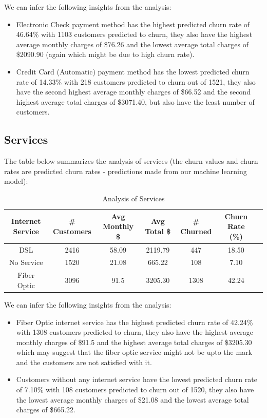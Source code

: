 \documentclass{article}
\theoremstyle{mytheoremstyle}
\theoremstyle{mytheoremstyle}
\theoremstyle{myproblemstyle}
\begin{document}
We can infer the following insights from the analysis:

\begin{itemize}
    \item Electronic Check payment method has the highest predicted churn rate of 46.64\% with 1103 customers predicted to churn, they also have the highest average monthly charges of \$76.26 and the lowest average total charges of \$2090.90 (again which might be due to high churn rate).
    \item Credit Card (Automatic) payment method has the lowest predicted churn rate of 14.33\% with 218 customers predicted to churn out of 1521, they also have the second highest average monthly charges of \$66.52 and the second highest average total charges of \$3071.40, but also have the least number of customers.
\end{itemize}


\subsection{Services}
The table below summarizes the analysis of services (the churn values and churn rates are predicted churn rates - predictions made from our machine learning model):

\begin{table}[H]
    \centering
    \begin{tabular}{|c|c|c|c|c|c|c|}
        \hline
        \textbf{Internet Service} & \textbf{\# Customers} & \textbf{Avg Monthly \$} & \textbf{Avg Total \$} & \textbf{\# Churned} & \textbf{Churn Rate (\%)} \\
        \hline
        DSL & 2416 & 58.09 & 2119.79 & 447 & 18.50 \\
        No Service & 1520 & 21.08 & 665.22 & 108 & 7.10 \\
        Fiber Optic & 3096 & 91.5 & 3205.30 & 1308 & 42.24 \\
        \hline
    \end{tabular}
    \caption{Analysis of Services}
\end{table}

We can infer the following insights from the analysis:

\begin{itemize}
    \item Fiber Optic internet service has the highest predicted churn rate of 42.24\% with 1308 customers predicted to churn, they also have the highest average monthly charges of \$91.5 and the highest average total charges of \$3205.30 which may suggest that the fiber optic service might not be upto the mark and the customers are not satisfied with it.
    \item Customers without any internet service have the lowest predicted churn rate of 7.10\% with 108 customers predicted to churn out of 1520, they also have the lowest average monthly charges of \$21.08 and the lowest average total charges of \$665.22.
\end{itemize}
\end{document}

